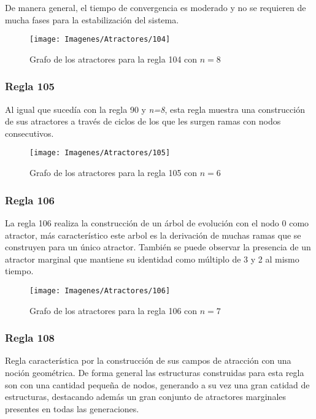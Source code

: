 \documentclass[]{article}
\begin{document}
				\hfill\break
				\justifying
				De manera general, el tiempo de convergencia es moderado y no se requieren de mucha fases para la estabilización del sistema.
				
				\hfill\break
				\hfill\break
				\begin{figure}[!h]
					\centering
					\texttt{[image: Imagenes/Atractores/104]}
					\caption{Grafo de los atractores para la regla 104 con $n=8$}
					\label{Regla_104}
				\end{figure}
			
			\newpage
			\subsubsection{Regla 105}
				\justifying
				Al igual que sucedía con la regla 90 y \textit{n=8}, esta regla muestra una construcción de sus atractores a través de ciclos de los que les surgen ramas con nodos consecutivos.
				
				\hfill\break
				\hfill\break
				\begin{figure}[!h]
					\centering
					\texttt{[image: Imagenes/Atractores/105]}
					\caption{Grafo de los atractores para la regla 105 con $n=6$}
					\label{Regla_105}
				\end{figure}
			
			\newpage
			\subsubsection{Regla 106}
				\justifying
				La regla 106 realiza la construcción de un árbol de evolución con el nodo 0 como atractor, más característico este arbol es la derivación de muchas ramas que se construyen para un único atractor. También se puede observar la presencia de un atractor marginal que mantiene su identidad como múltiplo de 3 y 2 al mismo tiempo.
				
				\hfill\break
				\hfill\break
				\begin{figure}[!h]
					\centering
					\texttt{[image: Imagenes/Atractores/106]}
					\caption{Grafo de los atractores para la regla 106 con $n=7$}
					\label{Regla_106}
				\end{figure}
			
			\newpage
			\subsubsection{Regla 108}
				\justifying
				Regla característica por la construcción de sus campos de atracción con una noción geométrica. De forma general las estructuras construidas para esta regla son con una cantidad pequeña de nodos, generando a su vez una gran catidad de estructuras, destacando además un gran conjunto de atractores marginales presentes en todas las generaciones.
				
\end{document}
